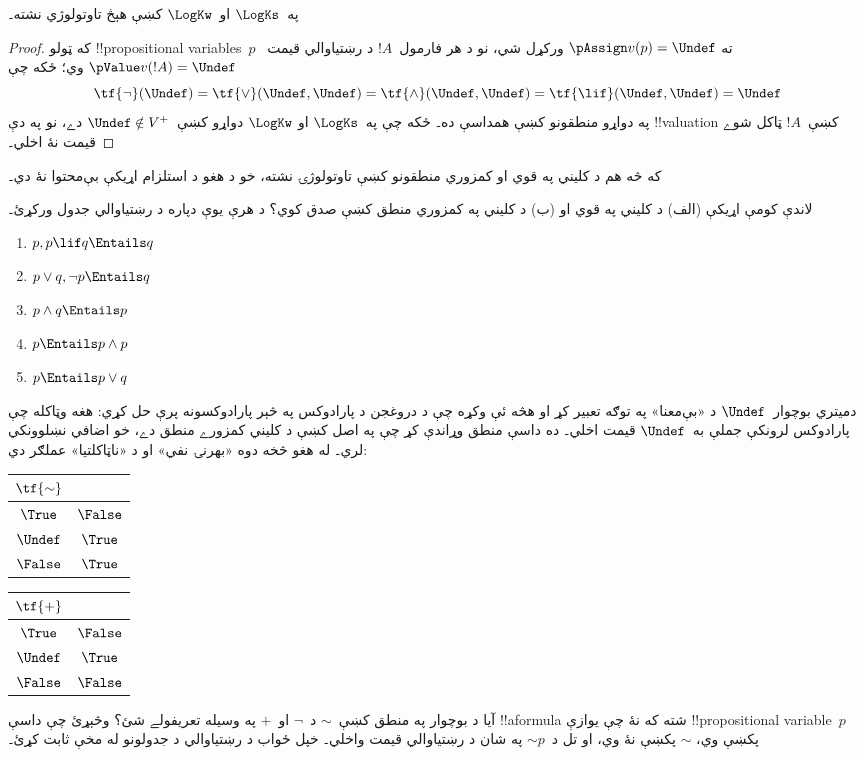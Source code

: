 \documentclass[../../../include/open-logic-section]{subfiles}
\begin{document}
\begin{prop}
  په~$\LogKs$ او~$\LogKw$ کښې هېڅ تاوتولوژي نشته۔
\end{prop}

\begin{proof}
  که ټولو !!{propositional variable}s~$p$ ته
  $\pAssign v(p) = \Undef$ ورکړل شي، نو د هر فارمول~$!A$
  د رښتياوالي قيمت~$\pValue v(!A) = \Undef$ وي؛ ځکه چې
  \[
    \tf{\lnot}(\Undef) = \tf{\lor}(\Undef, \Undef) = \tf{\land}(\Undef,
  \Undef) = \tf{\lif}(\Undef, \Undef) = \Undef
  \]
  په دواړو منطقونو کښې همداسې ده۔ ځکه چې په~$\LogKs$ او
  $\LogKw$ دواړو کښې~$\Undef \notin V^+$ دے، نو په دې
  !!{valuation} کښې~$!A$ ټاکل شوے قيمت نۀ اخلي۔
\end{proof}

که څه هم د کليني په قوي او کمزوري منطقونو کښې تاوتولوژۍ نشته،
خو د هغو د استلزام اړيکې بې‌محتوا نۀ دي۔

\begin{prob}
  لاندې کومې اړيکې (الف) د کليني په قوي او (ب) د کليني په
  کمزوري منطق کښې صدق کوي؟ د هرې يوې دپاره د رښتياوالي جدول ورکړئ۔
  \begin{enumerate}
    \item $p, p \lif q \Entails q$
    \item $p \lor q, \lnot p \Entails q$
    \item $p \land q \Entails p$
    \item $p \Entails p \land p$
    \item $p \Entails p \lor q$
  \end{enumerate}
\end{prob}

دميتري بوچوار~$\Undef$ د «بې‌معنا» په توګه تعبير کړ او هڅه ئې وکړه
چې د دروغجن د پارادوکس په څېر پارادوکسونه پرې حل کړي: هغه وټاکله
چې پارادوکس لرونکې جملې به~$\Undef$ قيمت اخلي۔ ده داسې منطق
وړاندې کړ چې په اصل کښې د کليني کمزورے منطق دے، خو اضافي
نښلوونکي لري۔ له هغو څخه دوه «بهرنۍ نفي» او د «ناټاکلتيا»
عملګر دي:
\begin{center}
  \begin{tabular}{c|c} 
    $\tf{\sim}$ & \\ 
    \hline  
    $\True$ & $\False$ \\ 
    $\Undef$ & $\True$ \\
    $\False$ & $\True$ 
  \end{tabular}
\quad
  \begin{tabular}{c|c} 
    $\tf{+}$ & \\ 
    \hline  
    $\True$ & $\False$ \\ 
    $\Undef$ & $\True$ \\
    $\False$ & $\False$ 
  \end{tabular}
\end{center}

\begin{prob}
  آيا د بوچوار په منطق کښې~$\sim$ د~$\lnot$ او~$+$ په وسيله
  تعريفولے شئ؟ وڅېړئ چې داسې !!a{formula} شته که نۀ چې يوازې
  !!{propositional
  variable}~$p$ پکښې وي، $\sim$ پکښې نۀ وي،
  او تل د~$\mathord{\sim}p$ په شان د رښتياوالي قيمت واخلي۔
  خپل ځواب د رښتياوالي د جدولونو له مخې ثابت کړئ۔
\end{prob}
\end{document}
